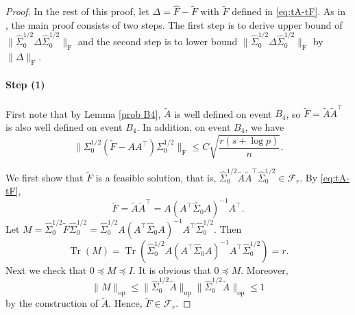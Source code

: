 \documentclass[11pt]{article}
\DeclareMathOperator{\Tr}{Tr}
\newcommand{\0}{{\mathbf{0}}}
\newcommand{\op}{{\mathrm{op}}}
\newcommand{\tA}{{\widetilde{A}}}
\newcommand{\tF}{{\widetilde{F}}}
\begin{document}
\begin{proof}
In the rest of this proof, 
let $\Delta=\widehat{F}-\tF$ with $\tF$ defined in \eqref{eq:tA-tF}. 
As in \cite{gao2017sparse}, the main proof consists of two steps. 
The first step is to derive upper bound of $\|\widehat{\Sigma}_0^{1/2}\Delta\widehat{\Sigma}_0^{1/2}\|_\mathrm{F}$ and the second step is to lower bound $\|\widehat{\Sigma}_0^{1/2}\Delta\widehat{\Sigma}_0^{1/2}\|_\mathrm{F}$ by $\|\Delta\|_\mathrm{F}$. 

\paragraph{Step (1)}
First note that by Lemma \ref{prob B4}, $\tA$ is well defined on event $B_4$, so $\tF=\tA\tA^\top  $ is also well defined on event $ B_4$.
In addition, on event $B_4$, we have
\begin{equation}
      \label{eq:oracle-error}
    \|\Sigma_0^{1/2}(\tF-AA^\top  )\Sigma_0^{1/2}\|_{\mathrm{F}}\leq C\sqrt{\frac{r(s+\log p)}{n}}.
\end{equation}
\par We first show that $\tF$ is a feasible solution, that is, $\widehat{\Sigma}_0^{1/2}\tA\tA^\top  \widehat{\Sigma}_0^{1/2}\in\mathcal{F}_r$. 
By \eqref{eq:tA-tF},
\begin{equation*}
    \tF=\tA\tA^\top  =A(A^\top  \widehat{\Sigma}_0A)^{-1}A^\top.
\end{equation*}
Let $M= \widehat{\Sigma}_0^{1/2} \tF \widehat{\Sigma}_0^{1/2} =\widehat{\Sigma}_0^{1/2}A(A^\top  \widehat{\Sigma}_0A)^{-1}A^\top  \widehat{\Sigma}_0^{1/2}$. 
Then 
\begin{equation*}
    \Tr(M)=\Tr(\widehat{\Sigma}_0^{1/2}A(A^\top  \widehat{\Sigma}_0A)^{-1}A^\top  \widehat{\Sigma}_0^{1/2})=r.
\end{equation*}
Next we check that $0\preceq M\preceq I$. It is obvious that $0\preceq M$.
Moreover,
\begin{equation*}
    \|M\|_{\op}\leq \|\widehat{\Sigma}_0^{1/2}\tA\|_{\op}\|\widehat{\Sigma}_0^{1/2}\tA\|_{\op}\leq 1
\end{equation*}
by the construction of $\tA$.  
Hence, $\tF\in \mathcal{F}_r$.


\end{proof}
\end{document}
